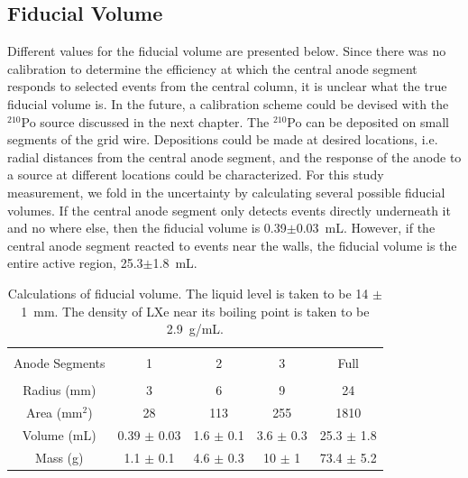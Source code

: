 \subsection{Fiducial Volume}
Different values for the fiducial volume are presented below. Since there was no calibration to determine the efficiency at which the central anode segment responds to selected events from the central column, it is unclear what the true fiducial volume is.  In the future, a calibration scheme could be devised with the $^{210}$Po source discussed in the next chapter. The $^{210}$Po can be deposited on small segments of the grid wire. Depositions could be made at desired locations, i.e. radial distances from the central anode segment, and the response of the anode to a source at different locations could be characterized. For this study measurement, we fold in the uncertainty by calculating several possible fiducial volumes. If the central anode segment only detects events directly underneath it and no where else, then the fiducial volume is 0.39$\pm$0.03~mL. However, if the central anode segment reacted to events near the walls, the fiducial volume is the entire active region, 25.3$\pm$1.8~mL.
\begin{table}[ht]
\centering
\begin{tabular}{ccccc}
\hline
\\[-5pt]
 Anode Segments & 1 & 2 & 3 & Full \\
\\[-5pt]
\hline
Radius (mm) & 3  & 6 & 9 & 24 \\
Area (mm$^{2}$) & 28 &  113 & 255 & 1810 \\
Volume (mL) & 0.39 $\pm$ 0.03 & 1.6 $\pm$ 0.1& 3.6 $\pm$ 0.3 & 25.3 $\pm$ 1.8 \\
Mass (g) & 1.1 $\pm$ 0.1 & 4.6 $\pm$ 0.3 & 10 $\pm$ 1 & 73.4 $\pm$ 5.2  \\

\hline
\end{tabular}
\caption{Calculations of fiducial volume. The liquid level is taken to be 14 $\pm$ 1~mm. The density of \acs{LXe} near its boiling point is taken to be 2.9~g/mL.}
\label{T:fiducial}
\end{table}



